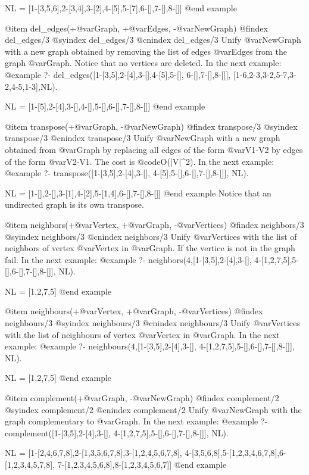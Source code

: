 {{{{{{{{NL = [1-[3,5,6],2-[3,4],3-[2],4-[5],5-[7],6-[],7-[],8-[]]
@end example

@item del_edges(+@var{Graph}, +@var{Edges}, -@var{NewGraph})
@findex  del_edges/3
@syindex del_edges/3
@cnindex del_edges/3
Unify @var{NewGraph} with a new graph obtained by removing the list of
edges @var{Edges} from the graph @var{Graph}. Notice that no vertices
are deleted. In the next example:
@example
?- del_edges([1-[3,5],2-[4],3-[],4-[5],5-[],
              6-[],7-[],8-[]],
             [1-6,2-3,3-2,5-7,3-2,4-5,1-3],NL).

NL = [1-[5],2-[4],3-[],4-[],5-[],6-[],7-[],8-[]]
@end example

@item transpose(+@var{Graph}, -@var{NewGraph})
@findex  transpose/3
@syindex transpose/3
@cnindex transpose/3
Unify @var{NewGraph} with a new graph obtained from @var{Graph} by
replacing all edges of the form @var{V1-V2} by edges of the form
@var{V2-V1}. The cost is @code{O(|V|^2)}. In the next example:
@example
?- transpose([1-[3,5],2-[4],3-[],
              4-[5],5-[],6-[],7-[],8-[]], NL).

NL = [1-[],2-[],3-[1],4-[2],5-[1,4],6-[],7-[],8-[]]
@end example
Notice that an undirected graph is its own transpose.

@item neighbors(+@var{Vertex}, +@var{Graph}, -@var{Vertices})
@findex  neighbors/3
@syindex neighbors/3
@cnindex neighbors/3
Unify @var{Vertices} with the list of neighbors of vertex @var{Vertex}
in @var{Graph}. If the vertice is not in the graph fail. In the next
example:
@example
?- neighbors(4,[1-[3,5],2-[4],3-[],
                4-[1,2,7,5],5-[],6-[],7-[],8-[]],
             NL).

NL = [1,2,7,5]
@end example

@item neighbours(+@var{Vertex}, +@var{Graph}, -@var{Vertices})
@findex  neighbours/3
@syindex neighbours/3
@cnindex neighbours/3
Unify @var{Vertices} with the list of neighbours of vertex @var{Vertex}
in @var{Graph}. In the next example:
@example
?- neighbours(4,[1-[3,5],2-[4],3-[],
                 4-[1,2,7,5],5-[],6-[],7-[],8-[]], NL).

NL = [1,2,7,5]
@end example

@item complement(+@var{Graph}, -@var{NewGraph})
@findex  complement/2
@syindex complement/2
@cnindex complement/2
Unify @var{NewGraph} with the graph complementary to @var{Graph}.
 In the next example:
@example
?- complement([1-[3,5],2-[4],3-[],
               4-[1,2,7,5],5-[],6-[],7-[],8-[]], NL).

NL = [1-[2,4,6,7,8],2-[1,3,5,6,7,8],3-[1,2,4,5,6,7,8],
      4-[3,5,6,8],5-[1,2,3,4,6,7,8],6-[1,2,3,4,5,7,8],
      7-[1,2,3,4,5,6,8],8-[1,2,3,4,5,6,7]]
@end example

}}}}}}}}
